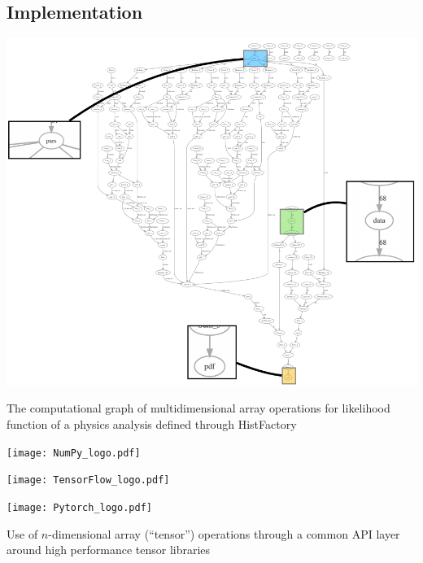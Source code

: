 \documentclass[a0,portrait]{a0poster}
\begin{document}
\begin{multicols}{2}
 \section*{\LARGE\color{MediumBlue} Implementation}
 \begin{center}
  \includegraphics[width=0.9\linewidth]{computational_graph.png}
 \end{center}
 The computational graph of multidimensional array operations for likelihood function of a physics analysis defined through HistFactory

 \vspace{1cm}
 \begin{minipage}{0.33\linewidth}
  \begin{center}
   \texttt{[image: NumPy\_logo.pdf]}
  \end{center}
 \end{minipage}%
 \quad
 \begin{minipage}{0.33\linewidth}
  \begin{center}
   \texttt{[image: TensorFlow\_logo.pdf]}
  \end{center}
 \end{minipage}%
 \quad
 \begin{minipage}{0.33\linewidth}
  \begin{center}
   \texttt{[image: Pytorch\_logo.pdf]}
  \end{center}
 \end{minipage}%
 \vspace{1cm}

 \noindent Use of $n$-dimensional array (``tensor'') operations through a common API layer around high performance tensor libraries



\end{multicols}
\end{document}

